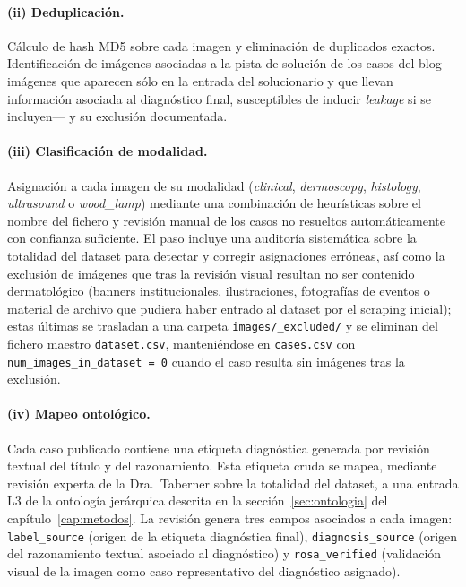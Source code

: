 \paragraph{(ii) Deduplicación.} Cálculo de hash MD5 sobre cada imagen
y eliminación de duplicados exactos. Identificación de imágenes
asociadas a la pista de solución de los casos del blog ---imágenes
que aparecen sólo en la entrada del solucionario y que llevan
información asociada al diagnóstico final, susceptibles de inducir
\emph{leakage} si se incluyen--- y su exclusión documentada.

\paragraph{(iii) Clasificación de modalidad.} Asignación a cada
imagen de su modalidad (\emph{clinical}, \emph{dermoscopy},
\emph{histology}, \emph{ultrasound} o \emph{wood\_lamp}) mediante una
combinación de heurísticas sobre el nombre del fichero y revisión
manual de los casos no resueltos automáticamente con confianza
suficiente. El paso incluye una auditoría sistemática sobre la
totalidad del dataset para detectar y corregir asignaciones erróneas,
así como la exclusión de imágenes que tras la revisión visual
resultan no ser contenido dermatológico (banners institucionales,
ilustraciones, fotografías de eventos o material de archivo que
pudiera haber entrado al dataset por el scraping inicial); estas
últimas se trasladan a una carpeta \texttt{images/\_excluded/} y se
eliminan del fichero maestro \texttt{dataset.csv}, manteniéndose en
\texttt{cases.csv} con \texttt{num\_images\_in\_dataset = 0} cuando
el caso resulta sin imágenes tras la exclusión.

\paragraph{(iv) Mapeo ontológico.} Cada caso publicado contiene una
etiqueta diagnóstica generada por revisión textual del título y del
razonamiento. Esta etiqueta cruda se mapea, mediante revisión experta
de la Dra.~Taberner sobre la totalidad del dataset, a una entrada L3
de la ontología jerárquica descrita en la sección~\ref{sec:ontologia}
del capítulo~\ref{cap:metodos}. La revisión genera tres campos
asociados a cada imagen: \texttt{label\_source} (origen de la
etiqueta diagnóstica final), \texttt{diagnosis\_source} (origen del
razonamiento textual asociado al diagnóstico) y
\texttt{rosa\_verified} (validación visual de la imagen como caso
representativo del diagnóstico asignado).

